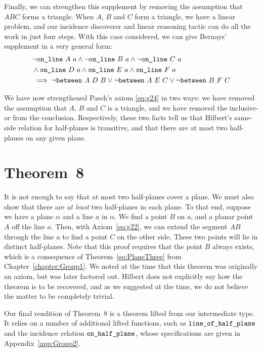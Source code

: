 Finally, we can strengthen this supplement by removing the assumption that $ABC$ forms a triangle. When $A$, $B$ and $C$ form a triangle, we have a linear problem, and our incidence discoverer and linear reasoning tactic can do all the work in just four steps. With this case considered, we can give Bernays' supplement in a very general form:
\begin{equation}\label{eq:SupplementI}
  \begin{split}
    &\neg\texttt{on\_line}\ A\ a \wedge \neg\texttt{on\_line}\ B\ a \wedge \neg\texttt{on\_line}\ C\ a\\
    &\wedge \texttt{on\_line}\ D\ a \wedge \texttt{on\_line}\ E\ a \wedge \texttt{on\_line}\ F\ a\\
    &\implies \neg\texttt{between}\ A\ D\ B \vee \neg\texttt{between}\ A\ E\ C \vee \neg\texttt{between}\ B\ F\ C
  \end{split}
\end{equation}

We have now strengthened Pasch's axiom \eqref{eq:g24} in two ways: we have removed the assumption that $A$, $B$ and $C$ is a triangle, and we have removed the inclusive-or from the conclusion. Respectively, these two facts tell us that Hilbert's same-side relation for half-planes is transitive, and that there are at most two half-planes on any given plane.

\section{Theorem~8}
It is not enough to say that at most two half-planes cover a plane. We must also show that there are \emph{at least} two half-planes in each plane. To that end, suppose we have a plane $\alpha$ and a line $a$ in $\alpha$. We find a  point $B$ on $a$, and a planar point $A$ off the line $a$. Then, with Axiom~\ref{eq:g22}, we can extend the segment $AB$ through the line $a$ to find a point $C$ on the other side. These two points will lie in distinct half-planes. Note that this proof requires that the point $B$ always exists, which is a consequence of Theorem~\ref{eq:PlaneThree} from Chapter~\ref{chapter:Group1}. We noted at the time that this theorem was originally an axiom, but was later factored out. Hilbert does not explicitly say how the theorem is to be recovered, and as we suggested at the time, we do not believe the matter to be completely trivial.

Our final rendition of Theorem~8 is a theorem lifted from our intermediate type. It relies on a number of additional lifted functions, such as $\texttt{line\_of\_half\_plane}$ and the incidence relation $\texttt{on\_half\_plane}$, whose specifications are given in Appendix~\ref{app:Group2}. 

